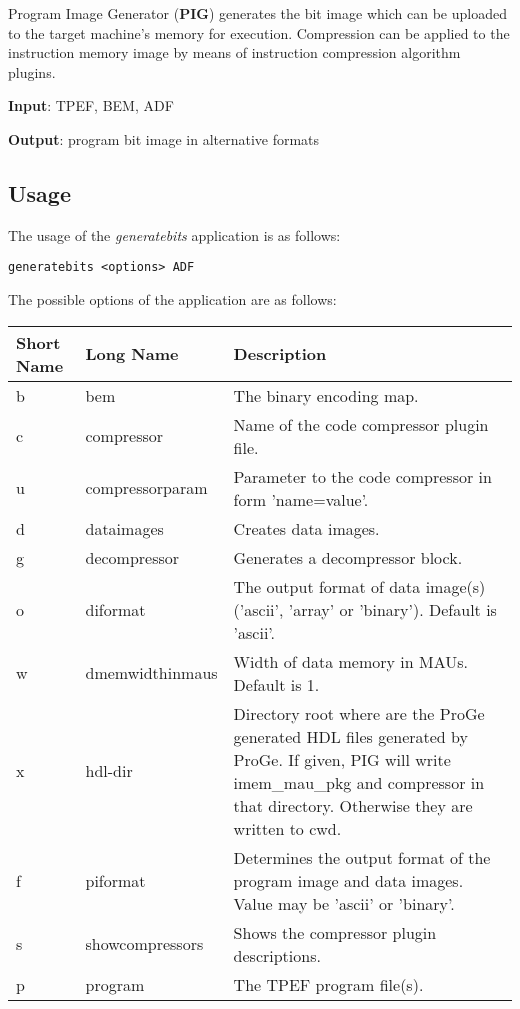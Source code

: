 \documentclass[twoside]{tceusermanual}
\begin{document}
Program Image Generator (\textbf{PIG}) generates the bit image which can be
uploaded to the target machine's memory for execution. Compression can be
applied to the instruction memory image by means of instruction compression
algorithm plugins.

\textbf{Input}: TPEF, BEM, ADF

\textbf{Output}: program bit image in alternative formats

\subsection{Usage}

The usage of the \emph{generatebits} application is as follows:

\begin{verbatim}
generatebits <options> ADF
\end{verbatim}

The possible options of the application are as follows:\\

\begin{tabular}{p{}p{}
                p{}}
\textbf{Short Name} &\textbf{Long Name} &\textbf{Description} \\
\hline
b & bem         & The binary encoding map.\\
c & compressor  & Name of the code compressor plugin file.\\
u & compressorparam & Parameter to the code compressor in form 'name=value'. \\
d & dataimages  & Creates data images.\\
g & decompressor & Generates a decompressor block. \\
o & diformat & The output format of data image(s) ('ascii', 'array'
or 'binary'). Default is 'ascii'. \\
w & dmemwidthinmaus & Width of data memory in MAUs. Default is 1. \\
x & hdl-dir & Directory root where are the ProGe generated HDL files
generated by ProGe. If given, PIG will write imem\_mau\_pkg and compressor
in that directory. Otherwise they are written to cwd.\\
f & piformat & Determines the output format of the program image and data
images. Value may be 'ascii' or 'binary'.\\
s & showcompressors & Shows the compressor plugin descriptions. \\
p & program & The TPEF program file(s).\\
\end{tabular}\\
\end{document}
